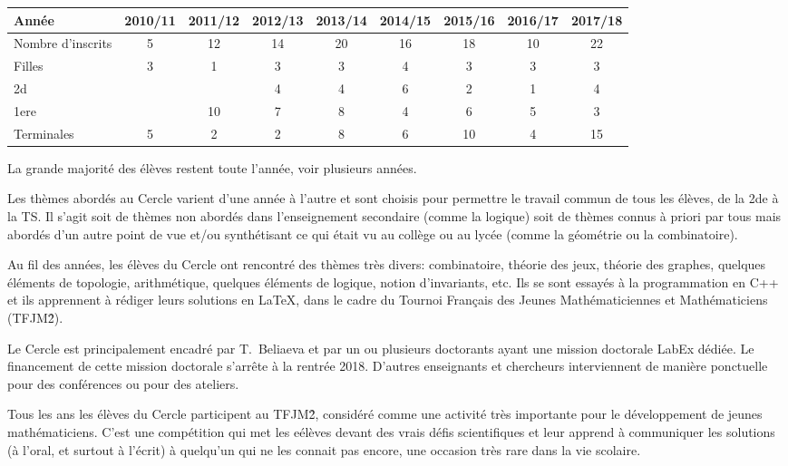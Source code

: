 \documentclass[11pt,notitlepage]{article}
\begin{document}
\medskip

\begin{tabular}{|l|c|c|c|c|c|c|c|c|}
	\hline
	Ann\'ee & 2010/11&2011/12&2012/13&2013/14&2014/15&2015/16& 2016/17&2017/18\\
	\hline
	Nombre d'inscrits&5 &12 &14 & 20&16 & 18&10 &22 \\
	\hline
	Filles& 3&1 &3 &3&4 &3 & 3&3 \\
	\hline
	2d& & &4 &4 &6 &2 &1 & 4\\
	\hline
	1ere& & 10&7 & 8&4 &6 &5 &3 \\
	\hline
	Terminales&5 &2 &2 &8 &6 &10 &4 &15 \\
	\hline
\end{tabular}

\medskip

La grande majorit\'e des \'el\`eves restent toute l'ann\'ee, voir plusieurs ann\'ees.

 Les th\`emes abord\'es au Cercle varient d'une ann\'ee \`a l'autre et
sont choisis pour permettre
le travail commun de tous les \'el\`eves, de la 2de \`a la TS. Il s'agit soit de th\`emes non abord\'es dans l'enseignement secondaire (comme la logique) soit de th\`emes 
connus \`a priori par tous mais abord\'es d'un autre point de vue et/ou synth\'etisant ce qui \'etait vu au coll\`ege ou au lyc\'ee (comme la g\'eom\'etrie ou la combinatoire).

Au fil des ann\'ees, les \'el\`eves du Cercle ont rencontr\'e  des th\`emes tr\`es divers: combinatoire, th\'eorie des jeux, th\'eorie des graphes, quelques \'el\'ements de topologie, 
arithm\'etique, quelques \'el\'ements de logique, notion d'invariants, etc. Ils se sont essay\'es \`a la programmation en C++ et ils apprennent \`a r\'ediger  leurs solutions en \LaTeX, 
dans le cadre du Tournoi Fran\c cais des Jeunes Math\'ematiciennes et Math\'ematiciens (TFJM\^2).

Le Cercle est principalement encadr\'e par T.~Beliaeva et par un ou plusieurs doctorants ayant une mission doctorale LabEx d\'edi\'ee. 
Le financement de cette mission doctorale s'arr\^ete \`a la rentr\'ee 2018. D'autres enseignants et chercheurs interviennent de mani\`ere ponctuelle pour des conf\'erences ou pour des ateliers.

Tous les ans les \'el\`eves du Cercle  participent au TFJM\^2, consid\'er\'e comme une activit\'e tr\`es importante pour le d\'eveloppement de jeunes math\'ematiciens. 
C'est une comp\'etition qui met les e\'el\`eves devant des vrais d\'efis scientifiques et leur  apprend \`a communiquer les solutions (\`a l'oral, et surtout \`a l'\'ecrit)
 \`a quelqu'un qui ne les connait pas encore, une occasion tr\`es rare dans la vie scolaire.
\end{document}
